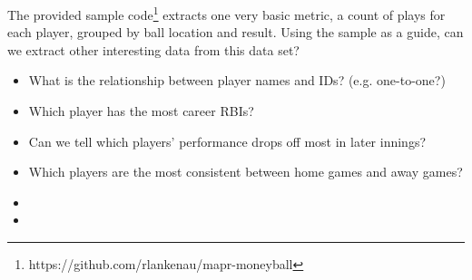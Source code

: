 \documentclass[10pt,letterpaper]{article}
\begin{document}
The provided sample code\footnote{https://github.com/rlankenau/mapr-moneyball} extracts one very basic metric, a count of plays for each player, grouped by ball location and result.  Using the sample as a guide, can we extract other interesting data from this data set?

\begin{itemize}
\item What is the relationship between player names and IDs? (e.g. one-to-one?)
\item Which player has the most career RBIs?
\item Can we tell which players' performance drops off most in later innings?
\item Which players are the most consistent between home games and away games?
\item
\item
\end{itemize}
\end{document}
